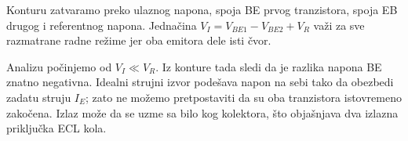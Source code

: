 Konturu zatvaramo preko ulaznog napona, spoja BE prvog tranzistora, spoja EB drugog i referentnog napona. Jednačina $V_I=V_{BE1}-V_{BE2}+V_R$ važi za sve razmatrane radne režime jer oba emitora dele isti čvor.

Analizu počinjemo od $V_I\ll V_R$. Iz konture tada sledi da je razlika napona BE znatno negativna. Idealni strujni izvor podešava napon na sebi tako da obezbedi zadatu struju $I_E$; zato ne možemo pretpostaviti da su oba tranzistora istovremeno zakočena. Izlaz može da se uzme sa bilo kog kolektora, što objašnjava dva izlazna priključka ECL kola.
